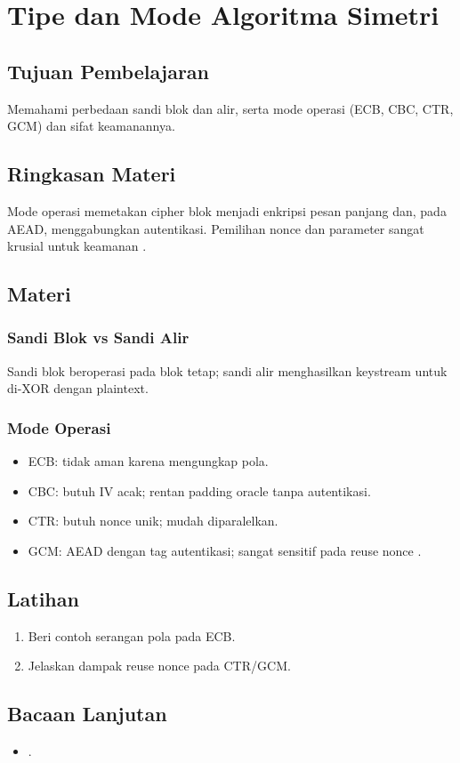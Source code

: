 \documentclass[../main.tex]{subfiles}
\begin{document}
\chapter{Tipe dan Mode Algoritma Simetri}
\section{Tujuan Pembelajaran}
Memahami perbedaan sandi blok dan alir, serta mode operasi (ECB, CBC, CTR, GCM) dan sifat keamanannya.

\section{Ringkasan Materi}
Mode operasi memetakan cipher blok menjadi enkripsi pesan panjang dan, pada AEAD, menggabungkan autentikasi. Pemilihan nonce dan parameter sangat krusial untuk keamanan \citep{sp80038a,sp80038d}.

\section{Materi}
\subsection{Sandi Blok vs Sandi Alir}
Sandi blok beroperasi pada blok tetap; sandi alir menghasilkan keystream untuk di-XOR dengan plaintext.

\subsection{Mode Operasi}
\begin{itemize}
  \item ECB: tidak aman karena mengungkap pola.
  \item CBC: butuh IV acak; rentan padding oracle tanpa autentikasi.
  \item CTR: butuh nonce unik; mudah diparalelkan.
  \item GCM: AEAD dengan tag autentikasi; sangat sensitif pada reuse nonce \citep{sp80038d}.
\end{itemize}

\section{Latihan}
\begin{enumerate}
  \item Beri contoh serangan pola pada ECB.
  \item Jelaskan dampak reuse nonce pada CTR/GCM.
\end{enumerate}

\section{Bacaan Lanjutan}
\begin{itemize}
  \item \citep{sp80038a,sp80038d}.
\end{itemize}
\end{document}
